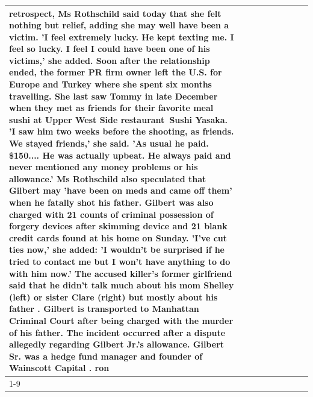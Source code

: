 \begin{table}[H]
\begin{tabular}{lllrlllll}
retrospect, Ms Rothschild said today that she felt nothing but relief, adding she may well have been a victim. 'I feel extremely lucky. He kept texting me. I feel so lucky. I feel I could have been one of his victims,' she added. Soon after the relationship ended, the former PR firm owner left the U.S. for Europe and Turkey where she spent six months  travelling. She last saw Tommy in late December when they met as friends for their favorite meal sushi at Upper West Side restaurant Sushi Yasaka. 'I saw him two weeks before the shooting, as friends. We stayed friends,' she said. 'As usual he paid. \$150.... He was actually upbeat. He always paid and never mentioned any money problems or his allowance.' Ms Rothschild also speculated that Gilbert may 'have been on meds and came off them' when he fatally shot his father. Gilbert was also charged with 21 counts of criminal possession of forgery devices after skimming device and 21 blank credit cards found at his home on Sunday. 'I've cut ties now,' she added: 'I wouldn’t be surprised if he tried to contact me but I won’t have anything to do with him now.' The accused killer's former girlfriend said that he didn't talk much about his mom Shelley (left) or sister Clare (right) but mostly about his father . Gilbert is transported to Manhattan Criminal Court  after being charged with the murder of his father. The incident occurred after a dispute allegedly regarding Gilbert Jr.'s allowance. Gilbert Sr. was a hedge fund manager and founder of Wainscott Capital . ron \\
\cline{1-9}

\end{tabular}
\end{table}
